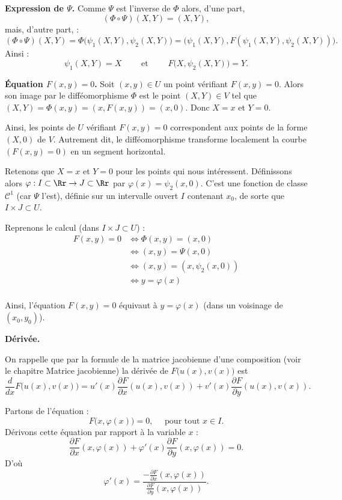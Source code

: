 \documentclass[11pt, class=report,crop=false]{standalone}
\begin{document}
\bigskip

\textbf{Expression de $\Psi$.}
Comme $\Psi$ est l'inverse de $\Phi$ alors, d'une part, 
$$(\Phi \circ \Psi) (X,Y) = (X,Y),$$
mais, d'autre part, :
$$(\Phi \circ \Psi) (X,Y)
= \Phi\big( \psi_1(X,Y), \psi_2(X,Y) \big) 
= \big(\psi_1(X,Y), F ( \psi_1(X,Y), \psi_2(X,Y)) \big).$$
Ainsi :
$$\psi_1(X,Y) = X \qquad \text{ et } \qquad F \big( X, \psi_2(X,Y) \big) = Y.$$

\bigskip

\textbf{\'Equation $F(x,y)=0$.}
Soit $(x,y) \in U$ un point vérifiant $F(x,y)=0$.
Alors son image par le difféomorphisme $\Phi$ est 
le point $(X,Y) \in V$ tel que $(X,Y)=\Phi(x,y)=(x,F(x,y))=(x,0)$. Donc $X=x$ et $Y=0$.

Ainsi, les points de $U$ vérifiant $F(x,y)=0$ correspondent aux points de la forme $(X,0)$ de $V$. Autrement dit, le difféomorphisme transforme localement la courbe $(F(x,y)=0)$ en un segment horizontal.


Retenons que $X=x$ et $Y=0$ pour les points qui nous intéressent. Définissons alors $\varphi : I \subset \Rr \to J \subset \Rr$ par $\varphi(x) = \psi_2(x,0)$. C'est une fonction de classe  $\mathcal{C}^1$ (car $\Psi$ l'est), définie sur un intervalle ouvert $I$ contenant $x_0$, de sorte que $I \times J \subset U$.

Reprenons le calcul (dans $I \times J \subset U$) :
\begin{align*}
F(x,y) = 0
&\iff \Phi(x,y) = (x,0) \\
&\iff (x,y) = \Psi(x,0) \\
&\iff (x,y) = (x, \psi_2(x,0) ) \\
&\iff y = \varphi(x) \\
\end{align*}   

Ainsi, l'équation $F(x,y)=0$ équivaut à $y=\varphi(x)$ (dans un voisinage de $(x_0,y_0)$).

\bigskip

\textbf{Dérivée.}

On rappelle que par la formule de la matrice jacobienne d'une composition (voir le chapitre \og{}Matrice jacobienne\fg{}) la dérivée de $F\big( u(x), v(x) \big)$ est
$$\frac{d}{dx}F\big( u(x), v(x) \big)
= u'(x) \frac{\partial F}{\partial x} (u(x), v(x)) + v'(x) \frac{\partial F}{\partial y}(u(x), v(x)).$$

Partons de l'équation :
$$F\big( x, \varphi(x) \big) = 0, \quad \text{ pour tout } x \in I.$$
Dérivons cette équation par rapport à la variable $x$ :
$$\frac{\partial F}{\partial x} (x, \varphi(x)) + \varphi'(x) \frac{\partial F}{\partial y} (x, \varphi(x)) = 0.$$
D'où
$$\varphi'(x) = \frac{-\frac{\partial F}{\partial x}(x, \varphi(x))}{\frac{\partial F}{\partial y}(x, \varphi(x))}.$$
\end{document}
